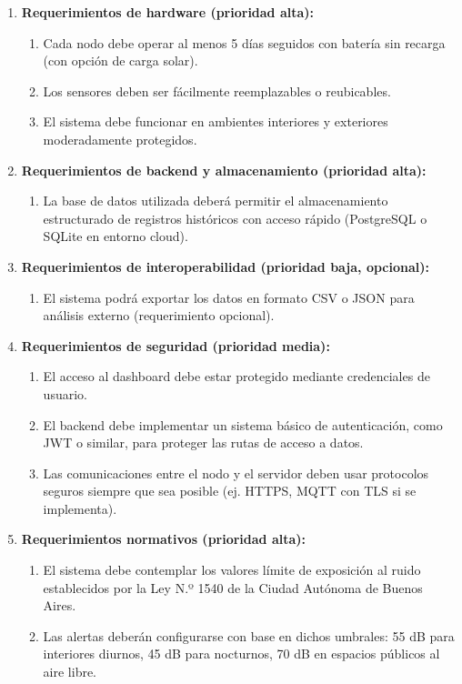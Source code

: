 \documentclass[
11pt, %
]{charter}
\begin{document}
\begin{enumerate}
    \item \textbf{Requerimientos de hardware (prioridad alta):}
    \begin{enumerate}
        \item Cada nodo debe operar al menos 5 días seguidos con batería sin recarga (con opción de carga solar).
        \item Los sensores deben ser fácilmente reemplazables o reubicables.
        \item El sistema debe funcionar en ambientes interiores y exteriores moderadamente protegidos.
    \end{enumerate}

    \item \textbf{Requerimientos de backend y almacenamiento (prioridad alta):}
    \begin{enumerate}
        \item La base de datos utilizada deberá permitir el almacenamiento estructurado de registros históricos con acceso rápido (PostgreSQL o SQLite en entorno cloud).
    \end{enumerate}

    \item \textbf{Requerimientos de interoperabilidad (prioridad baja, opcional):}
    \begin{enumerate}
        \item El sistema podrá exportar los datos en formato CSV o JSON para análisis externo (requerimiento opcional).
    \end{enumerate}

    \item \textbf{Requerimientos de seguridad (prioridad media):}
    \begin{enumerate}
        \item El acceso al dashboard debe estar protegido mediante credenciales de usuario.
        \item El backend debe implementar un sistema básico de autenticación, como JWT o similar, para proteger las rutas de acceso a datos.
        \item Las comunicaciones entre el nodo y el servidor deben usar protocolos seguros siempre que sea posible (ej. HTTPS, MQTT con TLS si se implementa).
    \end{enumerate}

    \item \textbf{Requerimientos normativos (prioridad alta):}
    \begin{enumerate}
        \item El sistema debe contemplar los valores límite de exposición al ruido establecidos por la Ley N.º 1540 de la Ciudad Autónoma de Buenos Aires.
        \item Las alertas deberán configurarse con base en dichos umbrales: 55 dB para interiores diurnos, 45 dB para nocturnos, 70 dB en espacios públicos al aire libre.
    \end{enumerate}
\end{enumerate}
\end{document}
